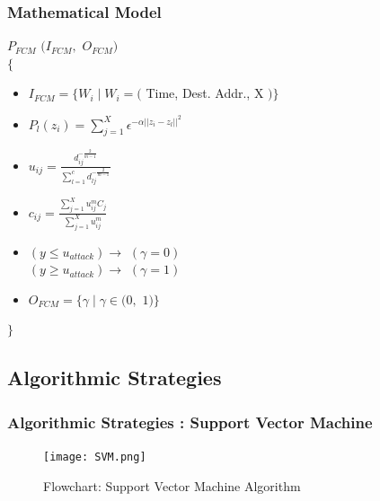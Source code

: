 \documentclass[10pt]{beamer}
\begin{document}
\begin{frame}
\frametitle{Mathematical Model}
\footnotesize
$P_{FCM} $ $ (I_{FCM},$ $O_{FCM})$\\
$\lbrace$
\indent
\begin{itemize}
\footnotesize
\item $I_{FCM} = \lbrace W_{i} \mid W_{i} = ($ Time, Dest. Addr., X $) \rbrace$

\item $P_{l}(z_{i}) = \sum_{j=1}^{X}  \epsilon ^ { - \alpha || z_{i} - z_{l} || ^{2}} $ 

\item $ u_{ij} = \frac{d_{ij}^{-\frac{2}{m-1}}}{\sum_{l=1}^{c} d_{lj}^{- \frac{2}{m-1}}} $

\item $ c_{ij} = \frac{\sum_{j=1}^{X} u_{ij}^{m}C_{j}}{\sum_{j=1}^{X} u_{ij}^{m}} $

\item $(y \leq u_{attack}) \rightarrow  $ $ (\gamma = 0)$ \\ $(y \geq u_{attack}) \rightarrow  $ $ (\gamma = 1)$

\item $ O_{FCM} = \lbrace \gamma \mid \gamma \in (0, $ $1) \rbrace$
\end{itemize}
$ \rbrace$

\end{frame}


\begin{frame}
\section[]{Algorithmic Strategies}
\frametitle{Algorithmic Strategies : Support Vector Machine}
\begin{figure}
\texttt{[image: SVM.png]}
\caption{\footnotesize Flowchart: Support Vector Machine Algorithm}
\end{figure}
\end{frame}
\end{document}
